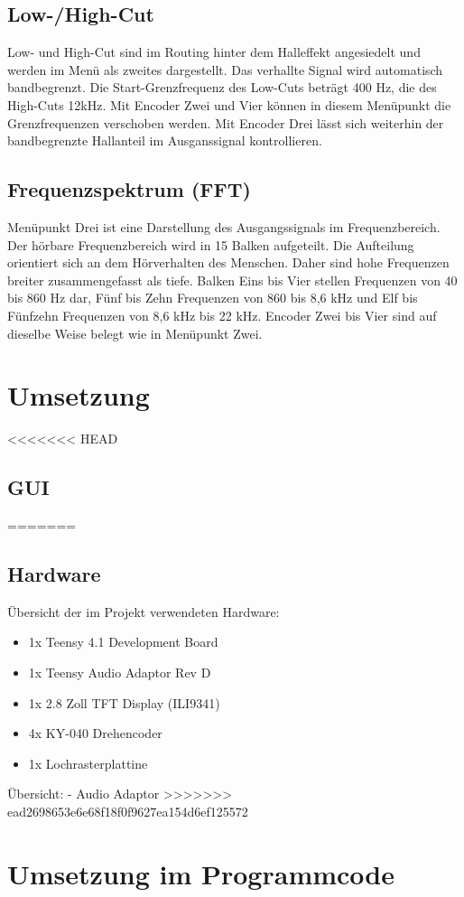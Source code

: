 \documentclass[12pt]{article}
\begin{document}
\subsection{Low-/High-Cut}
Low- und High-Cut sind im Routing hinter dem Halleffekt angesiedelt und werden im Menü als zweites dargestellt. 
Das verhallte Signal wird automatisch bandbegrenzt. 
Die Start-Grenzfrequenz des Low-Cuts beträgt 400 Hz, die des High-Cuts 12kHz. 
Mit Encoder Zwei und Vier können in diesem Menüpunkt die Grenzfrequenzen verschoben werden. 
Mit Encoder Drei lässt sich weiterhin der bandbegrenzte Hallanteil im Ausganssignal kontrollieren. 
\subsection{Frequenzspektrum (FFT)}
Menüpunkt Drei ist eine Darstellung des Ausgangssignals im Frequenzbereich. 
Der hörbare Frequenzbereich wird in 15 Balken aufgeteilt. Die Aufteilung orientiert sich an dem Hörverhalten des Menschen. 
Daher sind hohe Frequenzen breiter zusammengefasst als tiefe. 
Balken Eins bis Vier stellen Frequenzen von 40 bis 860 Hz dar, Fünf bis Zehn Frequenzen von 860 bis 8,6 kHz und Elf bis Fünfzehn Frequenzen von 8,6 kHz bis 22 kHz.
Encoder Zwei bis Vier sind auf dieselbe Weise belegt wie in Menüpunkt Zwei.
\section{Umsetzung}
<<<<<<< HEAD
\subsection{GUI}
=======
\subsection{Hardware}
Übersicht der im Projekt verwendeten Hardware:
\begin{itemize}
    \item 1x Teensy 4.1 Development Board
    \item 1x Teensy Audio Adaptor Rev D
    \item 1x 2.8 Zoll TFT Display (ILI9341)
    \item 4x KY-040 Drehencoder
    \item 1x Lochrasterplattine
\end{itemize}
Übersicht:
- Audio Adaptor 
>>>>>>> ead2698653e6e68f18f0f9627ea154d6ef125572
\newpage
\section{Umsetzung im Programmcode}
\end{document}
